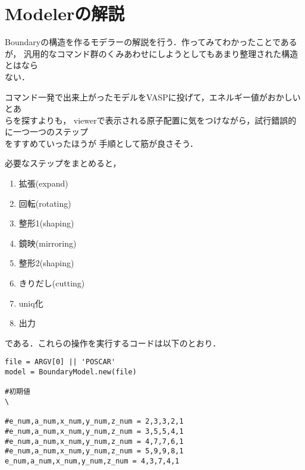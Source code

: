 
\section{Modelerの解説}
Boundaryの構造を作るモデラーの解説を行う．作ってみてわかったことであるが，
汎用的なコマンド群のくみあわせにしようとしてもあまり整理された構造とはなら\\
ない．

コマンド一発で出来上がったモデルをVASPに投げて，エネルギー値がおかしいとあ\\
らを探すよりも，
viewerで表示される原子配置に気をつけながら，試行錯誤的に一つ一つのステップ\\
をすすめていったほうが
手順として筋が良さそう．

必要なステップをまとめると，

\begin{enumerate}
\item 拡張(expand)
\item 回転(rotating)
\item 整形1(shaping)
\item 鏡映(mirroring)
\item 整形2(shaping)
\item きりだし(cutting)
\item uniq化
\item 出力
\end{enumerate}
である．これらの操作を実行するコードは以下のとおり．
\begin{lstlisting}[style=customRuby,basicstyle={\scriptsize\ttfamily}]
file = ARGV[0] || 'POSCAR'
model = BoundaryModel.new(file)

#初期値                                                                    \

#e_num,a_num,x_num,y_num,z_num = 2,3,3,2,1
#e_num,a_num,x_num,y_num,z_num = 3,5,5,4,1
#e_num,a_num,x_num,y_num,z_num = 4,7,7,6,1
#e_num,a_num,x_num,y_num,z_num = 5,9,9,8,1
e_num,a_num,x_num,y_num,z_num = 4,3,7,4,1
\end{lstlisting}

